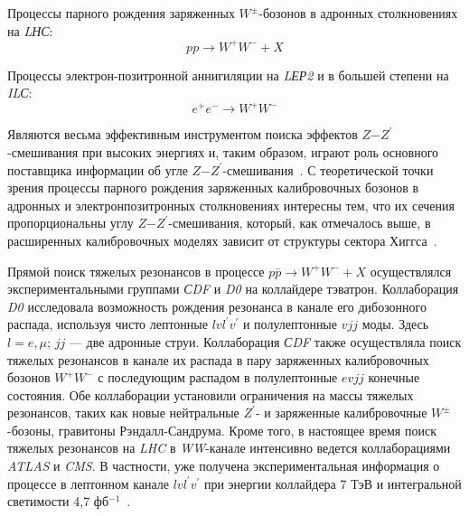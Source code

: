 Процессы парного рождения заряженных $W^±$-бозонов в адронных столкновениях на \textit{LНС}:
\begin{equation} \label{eq:drell3}
	pp \rightarrow W^+W^- + X
\end{equation}

Процессы электрон-позитронной аннигиляции на \textit{LЕР2} и в большей степени на \textit{ILС}:
\begin{equation} \label{eq:drell4}
	e^+e^- \rightarrow W^+W^-
\end{equation}

Являются весьма эффективным инструментом поиска эффектов $Z$−$Z^\prime$-смешивания при высоких энергиях и, таким образом, играют роль основного поставщика информации об угле $Z$−$Z^\prime$-смешивания~\cite{Bobovnikov:2016}. С теоретической точки зрения процессы парного рождения заряженных калибровочных бозонов в адронных и электронпозитронных столкновениях интересны тем, что их сечения пропорциональны углу $Z$−$Z^\prime$-смешивания, который, как отмечалось выше, в расширенных калибровочных моделях зависит от структуры сектора Хиггса~\cite{sirunyan:2017}.

Прямой поиск тяжелых резонансов в процессе $p\bar{p} \rightarrow W^+W^- + X$ осуществлялся экспериментальными группами \textit{СDF} и \textit{D0} на коллайдере тэватрон. Коллаборация \textit{D0} исследовала возможность рождения резонанса в канале его дибозонного распада, используя чисто лептонные $lvl^\prime v^\prime$ и полулептонные $vjj$ моды. Здесь $l=e,\mu$; $jj$ — две адронные струи. Коллаборация \textit{СDF} также осуществляла поиск тяжелых резонансов в канале их распада в пару заряженных калибровочных бозонов $W^+W^−$ с последующим распадом в полулептонные $evjj$ конечные состояния. Обе коллаборации установили ограничения на массы тяжелых резонансов, таких как новые нейтральные $Z^\prime$- и заряженные калибровочные $W^±$-бозоны, гравитоны Рэндалл-Сандрума. Кроме того, в настоящее время поиск тяжелых резонансов на \textit{LHC} в \textit{WW}-канале интенсивно ведется коллаборациями \textit{ATLAS} и \textit{CMS}. В частности, уже получена экспериментальная информация о процессе в лептонном канале $lvl^\prime v^\prime$ при энергии коллайдера 7 ТэВ и интегральной светимости 4,7 фб${}^{−1}$~\cite{2part-pankov}.


